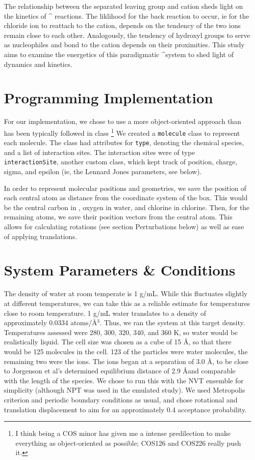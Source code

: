 \documentclass[12pt]{article}
\def\sn#1{\times 10^{#1}}
\begin{document}
The relationship between the separated leaving group and cation sheds light on the kinetics of \sn \: reactions. The liklihood for the back reaction to occur, ie for the chloride ion to reattach to the \tbutyl cation, depends on the tendency of the two ions remain close to each other. Analogously, the tendency of hydroxyl groups to serve as nucleophiles and bond to the \tbutyl cation depends on their proximities. This study aims to examine the energetics of this paradigmatic \sn system to shed light of dynamics and kinetics.

\section{Programming Implementation}
For our implementation, we chose to use a more object-oriented approach than has been typically followed in class \footnote{I think being a COS minor has given me a intense predilection to make everything as object-oriented as possible; COS126 and COS226 really push it.} We created a \texttt{molecule} class to represent each molecule. The class had attributes for \texttt{type}, denoting the chemical species, and a list of interaction sites. The interaction sites were of type \texttt{interactionSite}, another custom class, which kept track of position, charge, sigma, and epsilon (ie, the Lennard Jones parameters, see below).

In order to represent molecular positions and geometries, we save the position of each central atom as distance from the coordinate system of the box. This would be the central carbon in \tbutyl, oxygen in water, and chlorine in chlorine. Then, for the remaining atoms, we save their position vectors from the central atom. This allows for calculating rotations (see section Perturbations below) as well as ease of applying translations.

\section{System Parameters \& Conditions}
The density of water at room temperate is 1 g/mL. While this fluctuates slightly at different temperatures, we can take this as a reliable estimate for temperatures close to room temperature. 1 g/mL water translates to a density of approximately 0.0334 atoms/\AA$^{3}$. Thus, we ran the system at this target density. Temperatures assessed were 280, 300, 320, 340, and 360 K, so water would be realistically liquid. The cell size was chosen as a cube of 15 \AA, so that there would be 125 molecules in the cell. 123 of the particles were water molecules, the remaining two were the ions. The ions began at a separation of 3.0 \AA, to be close to Jorgenson et al's determined equilibrium distance of 2.9 \AA and comparable with the length of the \tbutyl species. We chose to run this with the NVT ensemble for simplicity (although NPT was used in the emulated study). We used Metropolis criterion and periodic boundary conditions as usual, and chose rotational and translation displacement to aim for an approximately 0.4 acceptance probability.
\end{document}
